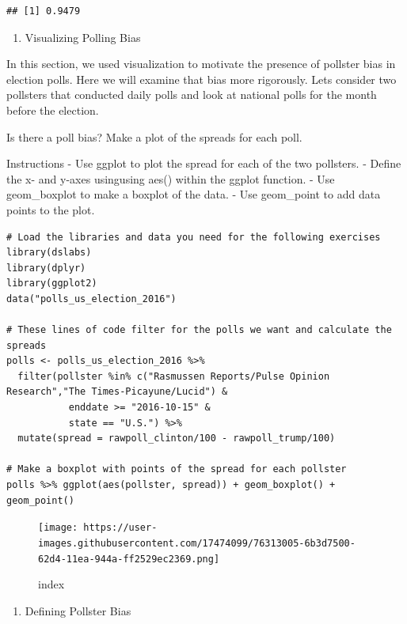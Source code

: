 \documentclass[
]{article}
\providecommand{\tightlist}{%
  \setlength{\itemsep}{0pt}\setlength{\parskip}{0pt}}
\begin{document}
\begin{verbatim}
## [1] 0.9479
\end{verbatim}

\begin{enumerate}
\def\labelenumi{\arabic{enumi}.}
\setcounter{enumi}{5}
\tightlist
\item
  Visualizing Polling Bias
\end{enumerate}

In this section, we used visualization to motivate the presence of
pollster bias in election polls. Here we will examine that bias more
rigorously. Lets consider two pollsters that conducted daily polls and
look at national polls for the month before the election.

Is there a poll bias? Make a plot of the spreads for each poll.

Instructions - Use ggplot to plot the spread for each of the two
pollsters. - Define the x- and y-axes usingusing aes() within the ggplot
function. - Use geom\_boxplot to make a boxplot of the data. - Use
geom\_point to add data points to the plot.

\begin{verbatim}
# Load the libraries and data you need for the following exercises
library(dslabs)
library(dplyr)
library(ggplot2)
data("polls_us_election_2016")

# These lines of code filter for the polls we want and calculate the spreads
polls <- polls_us_election_2016 %>% 
  filter(pollster %in% c("Rasmussen Reports/Pulse Opinion Research","The Times-Picayune/Lucid") &
           enddate >= "2016-10-15" &
           state == "U.S.") %>% 
  mutate(spread = rawpoll_clinton/100 - rawpoll_trump/100) 

# Make a boxplot with points of the spread for each pollster
polls %>% ggplot(aes(pollster, spread)) + geom_boxplot() + geom_point()
\end{verbatim}

\begin{figure}
\centering
\texttt{[image: https://user-images.githubusercontent.com/17474099/76313005-6b3d7500-62d4-11ea-944a-ff2529ec2369.png]}
\caption{index}
\end{figure}

\begin{enumerate}
\def\labelenumi{\arabic{enumi}.}
\setcounter{enumi}{6}
\tightlist
\item
  Defining Pollster Bias
\end{enumerate}
\end{document}
